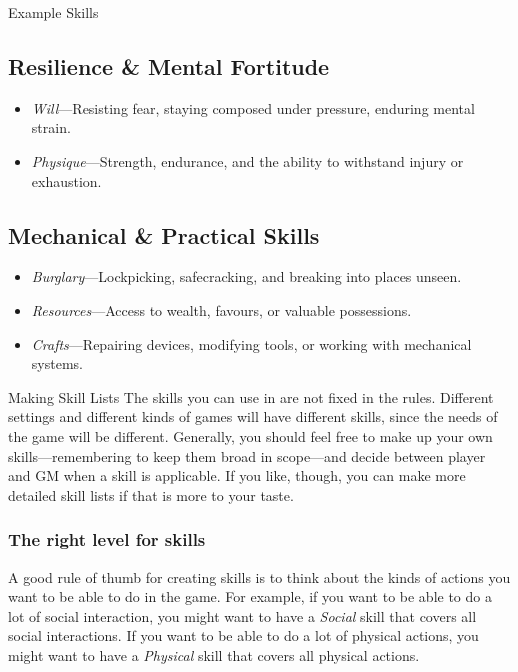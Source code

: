 \begin{multicols}{2}
\begin{WyrdExampleSidebar}{Example Skills}
			\subsection*{Resilience \& Mental Fortitude}  
			\begin{itemize}
				\item \emph{Will}---Resisting fear, staying composed under pressure, enduring mental strain.
				\item \emph{Physique}---Strength, endurance, and the ability to withstand injury or exhaustion.
			\end{itemize}
	
			\subsection*{Mechanical \& Practical Skills}  
			\begin{itemize}
				\item \emph{Burglary}---Lockpicking, safecracking, and breaking into places unseen.
				\item \emph{Resources}---Access to wealth, favours, or valuable possessions.
				\item \emph{Crafts}---Repairing devices, modifying tools, or working with mechanical systems.
			\end{itemize}
	\end{WyrdExampleSidebar}


	\begin{WyrdSidebar}{Making Skill Lists}
		The skills you can use in \wyrd are not fixed in the rules. Different settings and different kinds of games will have different skills, since the needs of the game will be different. Generally, you should feel free to make up your own skills---remembering to keep them broad in scope---and decide between player and GM when a skill is applicable. If you like, though, you can make more detailed skill lists if that is more to your taste.

		\subsubsection*{The right level for skills}
		A good rule of thumb for creating skills is to think about the kinds of actions you want to be able to do in the game. For example, if you want to be able to do a lot of social interaction, you might want to have a \emph{Social} skill that covers all social interactions. If you want to be able to do a lot of physical actions, you might want to have a \emph{Physical} skill that covers all physical actions.


\end{WyrdSidebar}
\end{multicols}

